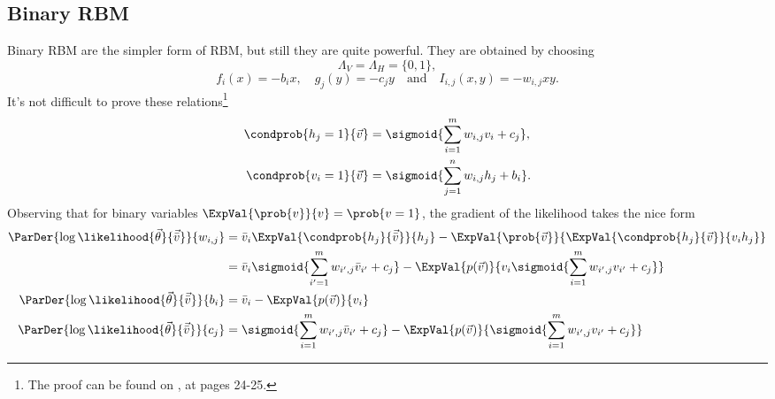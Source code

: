 \documentclass[]{article}
\begin{document}
  \subsection{Binary RBM}
  Binary RBM are the simpler form of RBM, but still they are quite powerful.
  They are obtained by choosing
  \[\Lambda_V = \Lambda_H = \{0,1\},\]
  \[
    f_i(x) = -b_ix, \quad g_j(y) = -c_jy  \quad\text{and}\quad I_{i,j}(x,y)=-w_{i,j}xy.
  \]
  It's not difficult to prove these relations\footnote{The proof can be found on
  \cite{fischer2012introduction}, at pages 24-25.}
  \begin{align*}
    \condprob{h_j=1}{\vec{v}} &= \sigmoid{\sum_{i=1}^m w_{i,j}v_i+c_j},\\
    \condprob{v_i=1}{\vec{v}} &= \sigmoid{\sum_{j=1}^n w_{i,j}h_j+b_i}.\\
  \end{align*}
  Observing that for binary variables \(\ExpVal{\prob{v}}{v} = \prob{v=1}\), the gradient of
  the likelihood takes the nice form
  \begin{align*}
    \ParDer{\log\likelihood{\vec{\theta}}{\vec{\bar{v}}}}{w_{i,j}}
      &= \bar{v}_i\ExpVal{\condprob{h_j}{\vec{\bar{v}}}}{h_j} 
         -\ExpVal{\prob{\vec{v}}}{\ExpVal{\condprob{h_j}{\vec{v}}}{v_ih_j}} \\
      &= \bar{v}_i \sigmoid{\sum_{i'=1}^m w_{i',j}\bar{v}_{i'}+c_j}
         -\ExpVal{p(\vec{v})}{v_i \sigmoid{\sum_{i=1}^m w_{i',j}v_{i'}+c_j}} \\
    \ParDer{\log\likelihood{\vec{\theta}}{\vec{\bar{v}}}}{b_i}
      &= \bar{v}_i -\ExpVal{p(\vec{v})}{v_i} \\
    \ParDer{\log\likelihood{\vec{\theta}}{\vec{\bar{v}}}}{c_j}
      &= \sigmoid{\sum_{i=1}^m w_{i',j}\bar{v}_{i'}+c_j}
         -\ExpVal{p(\vec{v})}{\sigmoid{\sum_{i=1}^m w_{i',j}v_{i'}+c_j}}
  \end{align*}
  
  
   
  
  
  
  \clearpage
  \printbibliography
\end{document}
